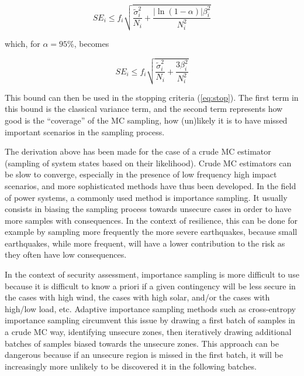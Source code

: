 \begin{equation}
  SE_i \leq f_i \sqrt{\frac{\tilde{\sigma}_i^2}{N_i} + \frac{|\ln(1-\alpha)| \beta_i^2}{N_i^2}}
\end{equation}

\noindent which, for \(\alpha = 95\%\), becomes

\begin{equation}
  \label{eq:SE_bound}
  SE_i \leq f_i \sqrt{\frac{\tilde{\sigma}_i^2}{N_i} + \frac{3 \beta_i^2}{N_i^2}}
\end{equation}


This bound can then be used in the stopping criteria (\ref{eq:stop}). The first term in this bound is the classical variance term, and the second term represents how good is the ``coverage'' of the MC sampling, \ie how (un)likely it is to have missed important scenarios in the sampling process.


The derivation above has been made for the case of a crude MC estimator (\ie sampling of system states based on their likelihood). Crude MC estimators can be slow to converge, especially in the presence of low frequency high impact scenarios, and more sophisticated methods have thus been developed. In the field of power systems, a commonly used method is importance sampling. It usually consists in biasing the sampling process towards unsecure cases in order to have more samples with consequences. In the context of resilience, this can be done for example by sampling more frequently the more severe earthquakes, because small earthquakes, while more frequent, will have a lower contribution to the risk as they often have low consequences.

In the context of security assessment, importance sampling is more difficult to use because it is difficult to know a priori if a given contingency will be less secure in the cases with high wind, the cases with high solar, and/or the cases with high/low load, etc. Adaptive importance sampling methods such as cross-entropy importance sampling circumvent this issue by drawing a first batch of samples in a crude MC way, identifying unsecure zones, then iteratively drawing additional batches of samples biased towards the unsecure zones. This approach can be dangerous because if an unsecure region is missed in the first batch, it will be increasingly more unlikely to be discovered it in the following batches.

